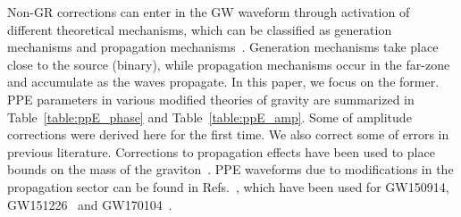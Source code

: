 \documentclass[prd,twocolumn,nofootinbib]{revtex4-1}
\begin{document}
Non-GR corrections can enter in the GW waveform through activation of different theoretical mechanisms, which can be classified as generation mechanisms and propagation mechanisms~\cite{Yunes:2016jcc}. Generation mechanisms take place close to the source (binary), while propagation mechanisms occur in the far-zone and accumulate as the waves propagate. In this paper, we focus on the former. PPE parameters in various modified theories of gravity are summarized in Table~\ref{table:ppE_phase} and Table~\ref{table:ppE_amp}.
Some of amplitude corrections were derived here for the first time. We also correct some of errors in previous literature.
Corrections to propagation effects have been used to place bounds on the mass of the graviton~\cite{Monitor:2017mdv}.
PPE waveforms due to modifications in the propagation sector can be found in Refs.~\cite{Mirshekari:2011yq,Yunes:2016jcc,Nishizawa:2017nef}, which have been used for GW150914, GW151226~\cite{Yunes:2016jcc} and GW170104~\cite{Abbott:2017vtc}. 


\end{document}
